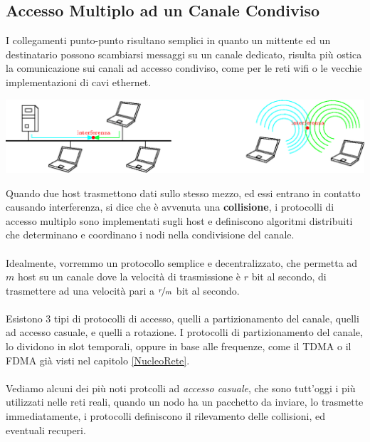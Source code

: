 \documentclass[12pt, letterpaper]{article}
\newcommand{\acc}{\\\hphantom{}\\}
\begin{document}
\subsection{Accesso Multiplo ad un Canale Condiviso}
I collegamenti punto-punto risultano semplici in quanto un mittente ed un destinatario possono scambiarsi messaggi 
su un canale dedicato, risulta più ostica la comunicazione sui canali ad accesso condiviso, come per le reti wifi o le 
vecchie implementazioni di cavi ethernet.\begin{center}
    \includegraphics[width=1\textwidth ]{images/AccessoMultiplo.eps}
\end{center} 
Quando due host trasmettono dati sullo stesso mezzo, ed essi entrano in contatto causando interferenza, si dice 
che è avvenuta una \textbf{collisione}, i protocolli di accesso multiplo sono implementati sugli host e definiscono 
algoritmi distribuiti che determinano e coordinano i nodi nella condivisione del canale.\acc 
Idealmente, vorremmo un protocollo semplice e decentralizzato, che permetta ad $m$ host su un canale dove la velocità 
di trasmissione è $r$ bit al secondo, di trasmettere ad una velocità pari a $\nicefrac{r}{m}$ bit al secondo.\acc 
Esistono 3 tipi di protocolli di accesso, quelli a partizionamento del canale, quelli ad accesso casuale, e quelli a rotazione. 
I protocolli di partizionamento del canale, lo dividono in slot temporali, oppure in base alle frequenze, come il 
TDMA o il FDMA già visti nel capitolo \ref{NucleoRete}.\acc 
Vediamo alcuni dei più noti protcolli ad \textit{accesso casuale}, che sono tutt'oggi i più utilizzati nelle 
reti reali, quando un nodo ha un pacchetto da inviare, lo trasmette immediatamente, i protocolli definiscono 
il rilevamento delle collisioni, ed eventuali recuperi.
\end{document}

